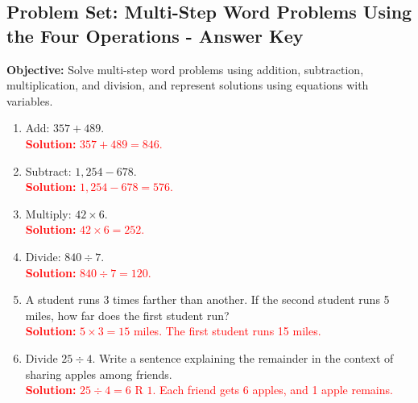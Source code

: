 \documentclass[12pt]{article}
\title{}
\date{}
\begin{document}
\subsection*{Problem Set: Multi-Step Word Problems Using the Four Operations - Answer Key}
\onehalfspacing

\begin{tcolorbox}[colframe=black!40, colback=gray!5, 
coltitle=black, colbacktitle=black!20, fonttitle=\bfseries\Large, 
title=Learning Objective, halign title=center, left=5pt, right=5pt, top=5pt, bottom=15pt]
\textbf{Objective:} Solve multi-step word problems using addition, subtraction, multiplication, and division, and represent solutions using equations with variables.
\end{tcolorbox}

\begin{tcolorbox}[colframe=black!60, colback=white, 
coltitle=black, colbacktitle=black!15, fonttitle=\bfseries\Large, 
title=Exercises, halign title=center, left=10pt, right=10pt, top=10pt, bottom=60pt]
\begin{enumerate}[itemsep=3em]
    \item Add: \( 357 + 489 \).\\
    \textcolor{red}{\textbf{Solution:} \( 357 + 489 = 846 \).}

    \item Subtract: \( 1,254 - 678 \).\\
    \textcolor{red}{\textbf{Solution:} \( 1,254 - 678 = 576 \).}

    \item Multiply: \( 42 \times 6 \).\\
    \textcolor{red}{\textbf{Solution:} \( 42 \times 6 = 252 \).}

    \item Divide: \( 840 \div 7 \).\\
    \textcolor{red}{\textbf{Solution:} \( 840 \div 7 = 120 \).}

    \item A student runs 3 times farther than another. If the second student runs 5 miles, how far does the first student run?\\
    \textcolor{red}{\textbf{Solution:} \( 5 \times 3 = 15 \) miles. The first student runs 15 miles.}

    \item Divide \( 25 \div 4 \). Write a sentence explaining the remainder in the context of sharing apples among friends.\\
    \textcolor{red}{\textbf{Solution:} \( 25 \div 4 = 6 \text{ R }1 \). Each friend gets 6 apples, and 1 apple remains.}


\end{enumerate}
\end{tcolorbox}
\end{document}
